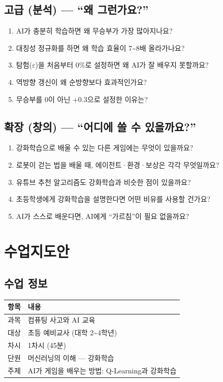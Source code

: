 \documentclass[11pt,a4paper]{article}
\begin{document}
\subsection{고급 (분석) — ``왜 그런가요?''}

\begin{enumerate}
\item AI가 충분히 학습하면 왜 무승부가 가장 많아지나요?
\item 대칭성 정규화를 하면 왜 학습 효율이 7\textasciitilde8배 올라가나요?
\item 탐험($\varepsilon$)을 처음부터 0\%로 설정하면 왜 AI가 잘 배우지 못할까요?
\item 역방향 갱신이 왜 순방향보다 효과적인가요?
\item 무승부를 0이 아닌 $+0.3$으로 설정한 이유는?
\end{enumerate}

\subsection{확장 (창의) — ``어디에 쓸 수 있을까요?''}

\begin{enumerate}
\item 강화학습으로 배울 수 있는 다른 게임에는 무엇이 있을까요?
\item 로봇이 걷는 법을 배울 때, 에이전트·환경·보상은 각각 무엇일까요?
\item 유튜브 추천 알고리즘도 강화학습과 비슷한 점이 있을까요?
\item 초등학생에게 강화학습을 설명한다면 어떤 비유를 사용할 건가요?
\item AI가 스스로 배운다면, AI에게 ``가르침''이 필요 없을까요?
\end{enumerate}

\section{수업지도안}

\subsection{수업 정보}

\begin{center}
\renewcommand{\arraystretch}{1.4}
\begin{tabular}{|l|l|}
\hline
\rowcolor{tableheader}
\textbf{항목} & \textbf{내용} \\
\hline
과목 & 컴퓨팅 사고와 AI 교육 \\
\hline
대상 & 초등 예비교사 (대학 2\textasciitilde4학년) \\
\hline
차시 & 1차시 (45분) \\
\hline
단원 & 머신러닝의 이해 — 강화학습 \\
\hline
주제 & AI가 게임을 배우는 방법: Q-Learning과 강화학습 \\
\hline
\end{tabular}
\end{center}
\end{document}
